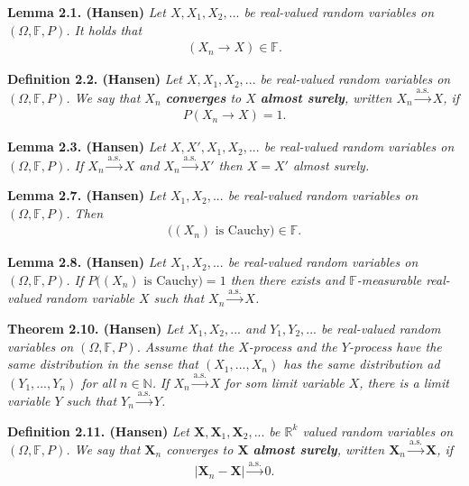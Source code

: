 \documentclass[
]{book}
\begin{document}
\textbf{Lemma 2.1. (Hansen)} \emph{Let \(X,X_1,X_2,...\) be real-valued random variables on \((\Omega, \mathbb{F},P)\). It holds that}
\begin{align*}
    (X_n\to X)\in \mathbb{F}.
\end{align*}

\textbf{Definition 2.2. (Hansen)} \emph{Let \(X,X_1,X_2,...\) be real-valued random variables on \((\Omega,\mathbb{F},P)\). We say that \(X_n\) \textbf{converges} to \(X\) \textbf{almost surely}, written \(X_n\stackrel{\text{a.s.}}{\to}X\), if}
\begin{align*}
    P(X_n\to X)=1.\tag{2.6}
\end{align*}

\textbf{Lemma 2.3. (Hansen)} \emph{Let \(X,X',X_1,X_2,...\) be real-valued random variables on \((\Omega,\mathbb{F},P)\). If \(X_n\stackrel{\text{a.s.}}{\to}X\) and \(X_n\stackrel{\text{a.s.}}{\to}X'\) then \(X=X'\) almost surely.}

\textbf{Lemma 2.7. (Hansen)} \emph{Let \(X_1,X_2,...\) be real-valued random variables on \((\Omega,\mathbb{F},P)\). Then}
\begin{align*}
    \Big((X_n)\text{ is Cauchy}\Big)\in \mathbb{F}.
\end{align*}

\textbf{Lemma 2.8. (Hansen)} \emph{Let \(X_1,X_2,...\) be real-valued random variables on \((\Omega,\mathbb{F},P)\). If \(P\Big((X_n)\text{ is Cauchy}\Big)=1\) then there exists and \(\mathbb{F}\)-measurable real-valued random variable \(X\) such that \(X_n\stackrel{\text{a.s.}}{\to}X\).}

\textbf{Theorem 2.10. (Hansen)} \emph{Let \(X_1,X_2,...\) and \(Y_1,Y_2,...\) be real-valued random variables on \((\Omega,\mathbb{F},P)\). Assume that the \(X\)-process and the \(Y\)-process have the same distribution in the sense that \((X_1,...,X_n)\) has the same distribution ad \((Y_1,...,Y_n)\) for all \(n\in\mathbb{N}\).}
\emph{If \(X_n\stackrel{\text{a.s.}}{\to}X\) for som limit variable \(X\), there is a limit variable \(Y\) such that \(Y_n\stackrel{\text{a.s.}}{\to}Y\).}

\textbf{Definition 2.11. (Hansen)} \emph{Let \(\mathbf{X},\mathbf{X}_1,\mathbf{X}_2,...\) be \(\mathbb{R}^k\) valued random variables on \((\Omega, \mathbb{F},P)\). We say that \(\mathbf{X}_n\) converges to \(\mathbf{X}\) \textbf{almost surely}, written \(\mathbf{X}_n\stackrel{\text{a.s.}}{\to}\mathbf{X}\), if}
\begin{align*}
    \vert\mathbf{X}_n-\mathbf{X}\vert \stackrel{\text{a.s.}}{\to} 0.\tag{2.15}
\end{align*}
\end{document}
